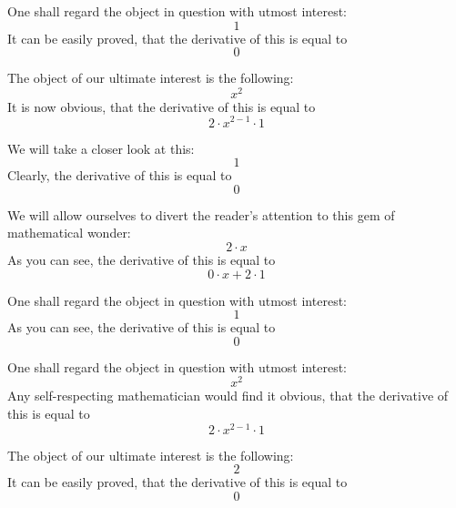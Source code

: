\documentclass{article}
\begin{document}
One shall regard the object in question with utmost interest:
\begin{equation}
1 
\end{equation}
It can be easily proved, that the derivative of this is equal to
\begin{equation}
0 
\end{equation}

The object of our ultimate interest is the following:
\begin{equation}
x ^{2 } 
\end{equation}
It is now obvious, that the derivative of this is equal to
\begin{equation}
2 \cdot x ^{2 - 1 } \cdot 1 
\end{equation}

We will take a closer look at this:
\begin{equation}
1 
\end{equation}
Clearly, the derivative of this is equal to
\begin{equation}
0 
\end{equation}

We will allow ourselves to divert the reader's attention to this gem of mathematical wonder:
\begin{equation}
2 \cdot x 
\end{equation}
As you can see, the derivative of this is equal to
\begin{equation}
0 \cdot x + 2 \cdot 1 
\end{equation}

One shall regard the object in question with utmost interest:
\begin{equation}
1 
\end{equation}
As you can see, the derivative of this is equal to
\begin{equation}
0 
\end{equation}

One shall regard the object in question with utmost interest:
\begin{equation}
x ^{2 } 
\end{equation}
Any self-respecting mathematician would find it obvious, that the derivative of this is equal to
\begin{equation}
2 \cdot x ^{2 - 1 } \cdot 1 
\end{equation}

The object of our ultimate interest is the following:
\begin{equation}
2 
\end{equation}
It can be easily proved, that the derivative of this is equal to
\begin{equation}
0 
\end{equation}
\end{document}
